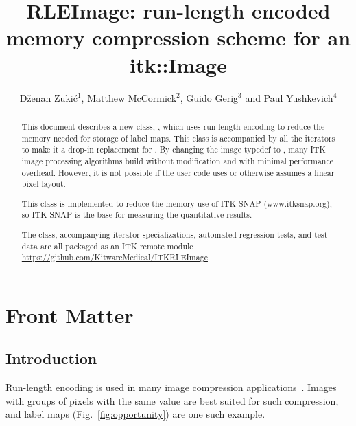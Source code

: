 \documentclass{InsightArticle}
\title{RLEImage: run-length encoded memory compression scheme for an itk::Image}
\author{D{\v z}enan Zuki{\' c}$^{1}$, Matthew McCormick$^{2}$, Guido Gerig$^{3}$ and Paul Yushkevich$^{4}$}
\newcommand{\IJhandlerIDnumber}{3562}
\begin{document}
\IJhandlefooter{\IJhandlerIDnumber}

\ifpdf
\else
\fi

\maketitle

\ifhtml
\chapter*{Front Matter\label{front}}
\fi


\begin{abstract}
\noindent
This document describes a new class, ,
which uses run-length encoding to reduce the memory needed for storage of label maps.
This class is accompanied by all the iterators
to make it a drop-in replacement for .
By changing the image typedef to ,
many ITK image processing algorithms build without modification and
with minimal performance overhead.
However, it is not possible if the user code
uses  or otherwise assumes a linear pixel layout.

This class is implemented to reduce the memory use of ITK-SNAP (\url{www.itksnap.org}),
so ITK-SNAP is the base for measuring the quantitative results.

The class, accompanying iterator specializations, automated regression tests, and test data
are all packaged as an ITK remote module \url{https://github.com/KitwareMedical/ITKRLEImage}.
\end{abstract}

\IJhandlenote{\IJhandlerIDnumber}

\tableofcontents


\section{Introduction}

Run-length encoding is used in many image compression applications~\cite{wikiRLE}.
Images with groups of pixels with the same value are best suited for such compression,
and label maps (Fig.~\ref{fig:opportunity}) are one such example.
\end{document}
